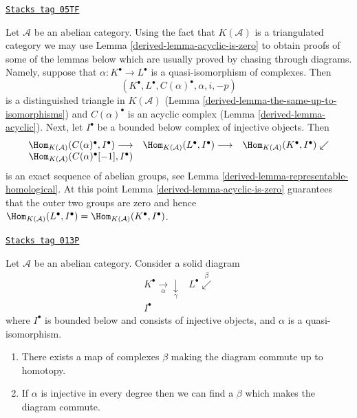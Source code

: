 \begin{remark}
\label{derived-remark-easier-proofs}
\href{https://stacks.math.columbia.edu/tag/05TF}{\texttt{Stacks tag 05TF}}

Let $\mathcal{A}$ be an abelian category.
Using the fact that $K(\mathcal{A})$ is a triangulated category we
may use
Lemma \ref{derived-lemma-acyclic-is-zero}
to obtain proofs of some of the lemmas below which are usually proved by
chasing through diagrams.
Namely, suppose that $\alpha : K^\bullet \to L^\bullet$ is a quasi-isomorphism
of complexes. Then
$$
(K^\bullet, L^\bullet, C(\alpha)^\bullet, \alpha, i, -p)
$$
is a distinguished triangle in $K(\mathcal{A})$
(Lemma \ref{derived-lemma-the-same-up-to-isomorphisms})
and $C(\alpha)^\bullet$ is an acyclic complex
(Lemma \ref{derived-lemma-acyclic}).
Next, let $I^\bullet$ be a bounded below complex of injective objects. Then
$$
\begin{array}{ccc}\Hom_{K(\mathcal{A})}(C(\alpha)^\bullet, I^\bullet) \longrightarrow & \Hom_{K(\mathcal{A})}(L^\bullet, I^\bullet) \longrightarrow & \Hom_{K(\mathcal{A})}(K^\bullet, I^\bullet) \swarrow \\ \Hom_{K(\mathcal{A})}(C(\alpha)^\bullet[-1], I^\bullet) &  & \end{array}
$$
is an exact sequence of abelian groups, see
Lemma \ref{derived-lemma-representable-homological}.
At this point
Lemma \ref{derived-lemma-acyclic-is-zero}
guarantees that the outer two groups are zero and hence
$\Hom_{K(\mathcal{A})}(L^\bullet, I^\bullet) =
\Hom_{K(\mathcal{A})}(K^\bullet, I^\bullet)$.
\end{remark}

\begin{lemma}
\label{derived-lemma-morphisms-lift}
\href{https://stacks.math.columbia.edu/tag/013P}{\texttt{Stacks tag 013P}}

Let $\mathcal{A}$ be an abelian category.
Consider a solid diagram
$$
\begin{array}{cc}K^\bullet \underset{\alpha}{\longrightarrow}\underset{\gamma}{\downarrow} & L^\bullet \overset{\beta}{\swarrow} \\ I^\bullet & \end{array}
$$
where $I^\bullet$ is bounded below and consists of injective
objects, and $\alpha$ is a quasi-isomorphism.
\begin{enumerate}
\item There exists a map of complexes $\beta$ making the diagram
commute up to homotopy.
\item If $\alpha$ is injective in every degree
then we can find a $\beta$ which makes the diagram commute.
\end{enumerate}
\end{lemma}

